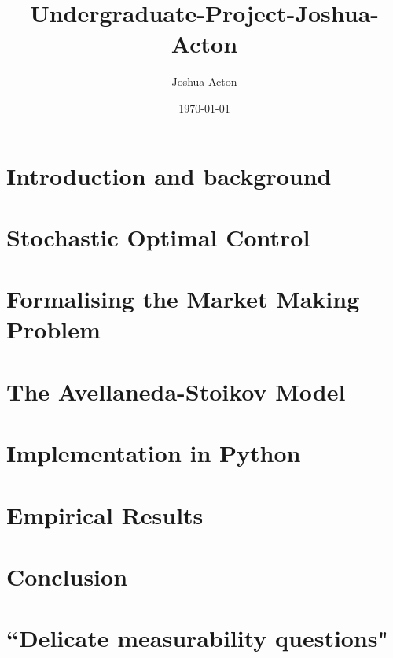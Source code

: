 \documentclass[11pt,twoside]{report}
\title{Undergraduate-Project-Joshua-Acton}
\author{Joshua Acton}
\date{\today}
\begin{document}










\tableofcontents

\listoffigures

\chapter{Introduction and background}


\chapter{Stochastic Optimal Control}


\chapter{Formalising the Market Making Problem}


\chapter{The Avellaneda-Stoikov Model}


\chapter{Implementation in Python}

\chapter{Empirical Results}

\chapter{Conclusion}

\appendix
\chapter{``Delicate measurability questions"}


\printbibliography
\end{document}
